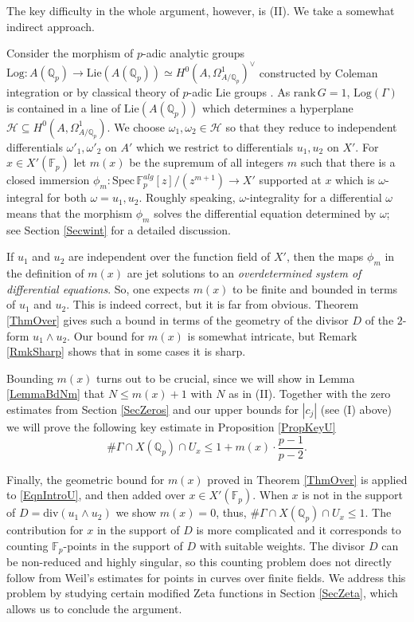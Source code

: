 \documentclass[11pt]{amsart}
\theoremstyle{remark}
\numberwithin{equation}{section}
\newcommand{\Hcal}{\mathscr{H}}
\newcommand{\F}{\mathbb{F}}
\newcommand{\Q}{\mathbb{Q}}
\newcommand{\Spec}{\mathrm{Spec}\,}
\newcommand{\Lie}{\mathrm{Lie}}
\newcommand{\rk}{\mathrm{rank}\,}
\newcommand{\Log}{\mathrm{Log}}
\newcommand{\divi}{\mathrm{div}}
\begin{document}
The key difficulty in the whole argument, however, is (II). We take a somewhat indirect approach.

Consider the morphism of $p$-adic analytic groups $\Log:A(\Q_p)\to \Lie(A(\Q_p))\simeq H^0(A,\Omega^1_{A/\Q_p})^\vee$ constructed by Coleman integration or by classical theory of $p$-adic Lie groups \cite{Bourbaki}. As $\rk G=1$,  $\Log(\Gamma)$ is contained in a line of $\Lie(A(\Q_p))$ which determines a hyperplane $\Hcal\subseteq H^0(A,\Omega^1_{A/\Q_p})$. We choose $\omega_1,\omega_2\in \Hcal$ so that they reduce to independent differentials $\omega'_1,\omega'_2$ on $A'$ which we restrict to differentials $u_1,u_2$ on $X'$. For $x\in X'(\F_p)$ let $m(x)$ be the supremum of all integers $m$ such that there is a closed immersion $\phi_m:\Spec \F_p^{alg}[z]/(z^{m+1})\to X'$ supported at $x$ which is $\omega$-integral for both $\omega=u_1,u_2$. Roughly speaking, $\omega$-integrality for a differential $\omega$ means that the morphism $\phi_m$ solves the differential equation determined by $\omega$; see Section \ref{Secwint} for a detailed discussion.

If $u_1$ and $u_2$ are independent over the function field of  $X'$, then the maps $\phi_m$ in the definition of $m(x)$ are jet solutions to an \emph{overdetermined system of differential equations}. So, one expects $m(x)$ to be finite and bounded in terms of $u_1$ and $u_2$. This is indeed correct, but it is far from obvious. Theorem \ref{ThmOver} gives such a bound in terms of the geometry of the divisor $D$ of the $2$-form $u_1\wedge u_2$. Our bound for $m(x)$ is somewhat intricate, but Remark \ref{RmkSharp} shows that in some cases it is sharp. 


Bounding $m(x)$ turns out to be crucial, since we will show in Lemma \ref{LemmaBdNm} that $N\le m(x)+1$ with $N$ as in (II). Together with the zero estimates from Section \ref{SecZeros} and our upper bounds for $|c_j|$ (see (I) above) we will prove the following key estimate in Proposition \ref{PropKeyU} 
\begin{equation}\label{EqnIntroU}
\#\Gamma\cap X(\Q_p)\cap U_x\le 1+ m(x)\cdot\frac{p-1}{p-2}.
\end{equation}

Finally, the geometric bound for $m(x)$ proved in Theorem \ref{ThmOver} is applied to \eqref{EqnIntroU}, and then added over $x\in X'(\F_p)$. When $x$ is not in the support of $D=\divi(u_1\wedge u_2)$ we show $m(x)=0$, thus, $\#\Gamma\cap X(\Q_p)\cap U_x\le 1$.  The contribution for $x$ in the support of $D$ is more complicated and it corresponds to counting $\F_p$-points in the support of  $D$ with suitable weights. The divisor $D$ can be non-reduced and highly singular, so this counting problem does not directly follow from Weil's estimates for points in curves over finite fields. We address this problem by studying certain modified Zeta functions in Section \ref{SecZeta}, which allows us to conclude the argument.
\end{document}
